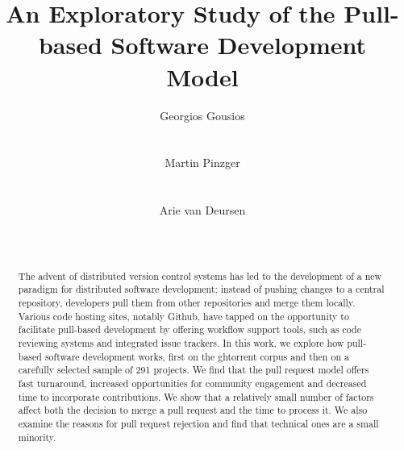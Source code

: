 \documentclass{sig-alternate}
\begin{document}
\newcommand{\todo}[1]{\textbf{TODO}\footnote{\textbf{TODO:} #1}}

\newcommand{\ghtorrent}{ \textsc{ght}orrent\xspace}
\newcommand{\api}{\textsc{api}\xspace}

\title{An Exploratory Study of the Pull-based Software Development Model}

\author{
\alignauthor
Georgios Gousios\\
       \\
       \\
\alignauthor
Martin Pinzger\\
       \\
       \\
\alignauthor
Arie van Deursen\\
       \\
       \\       
}

\maketitle

\begin{abstract}

  The advent of distributed version control systems has led to the development
  of a new paradigm for distributed software development; instead of pushing
  changes to a central repository, developers pull them from other repositories
  and merge them locally. Various code hosting sites, notably Github, have
  tapped on the opportunity to facilitate pull-based development by offering
  workflow support tools, such as code reviewing systems and integrated issue
  trackers. In this work, we explore how pull-based software development works,
  first on the {\sc ght}orrent corpus and then on a carefully selected sample of 291
  projects. We find that the pull request model offers fast turnaround,
  increased opportunities for community engagement and decreased
  time to incorporate contributions. We show that a relatively
  small number of factors affect both the decision to merge a pull request and
  the time to process it. We also examine the reasons for pull request
  rejection and find that technical ones are a small minority.

\end{abstract}
\end{document}
